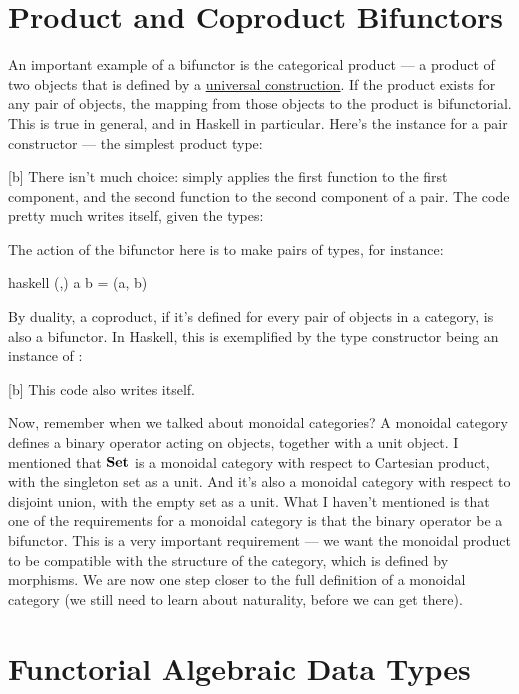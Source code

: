 \section{Product and Coproduct Bifunctors}

An important example of a bifunctor is the categorical product --- a
product of two objects that is defined by a \hyperref[products-and-coproducts]{universal
  construction}. If the product exists for any pair of objects, the
mapping from those objects to the product is bifunctorial. This is true
in general, and in Haskell in particular. Here's the 
instance for a pair constructor --- the simplest product type:

[b]
There isn't much choice:  simply applies the first
function to the first component, and the second function to the second
component of a pair. The code pretty much writes itself, given the
types:

The action of the bifunctor here is to make pairs of types, for
instance:

\begin{snip}{haskell}
(,) a b = (a, b)
\end{snip}
By duality, a coproduct, if it's defined for every pair of objects in a
category, is also a bifunctor. In Haskell, this is exemplified by the
 type constructor being an instance of
:

[b]
This code also writes itself.

Now, remember when we talked about monoidal categories? A monoidal
category defines a binary operator acting on objects, together with a
unit object. I mentioned that $\mathbf{Set}$ is a monoidal category with
respect to Cartesian product, with the singleton set as a unit. And it's
also a monoidal category with respect to disjoint union, with the empty
set as a unit. What I haven't mentioned is that one of the requirements
for a monoidal category is that the binary operator be a bifunctor. This
is a very important requirement --- we want the monoidal product to be
compatible with the structure of the category, which is defined by
morphisms. We are now one step closer to the full definition of a
monoidal category (we still need to learn about naturality, before we
can get there).

\section{Functorial Algebraic Data Types}

